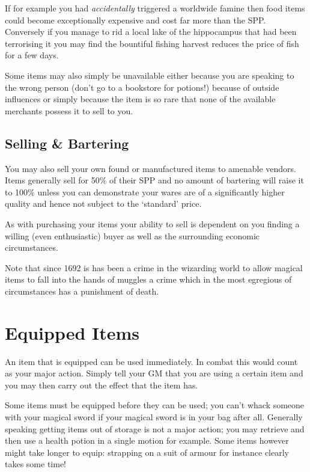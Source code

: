 If\comma{} for example\comma{} you had {\it accidentally} triggered a worldwide famine\comma{} then food items could become exceptionally expensive and cost far more than the SPP. Conversely\comma{} if you manage to rid a local lake of the hippocampus that had been terrorising it\comma{} you may find the bountiful fishing harvest reduces the price of fish for a few days. 

Some items may also simply be unavailable \minus{} either because you are speaking to the wrong person (don't go to a bookstore for potions!)\comma{} because of outside influences\comma{} or simply because the item is so rare that none of the available merchants possess it to sell to you. 

\subsection{Selling \& Bartering}

You may also sell your own found or manufactured items to amenable vendors. Items generally sell for 50\% of their SPP\comma{} and no amount of bartering will raise it to 100\%\comma{} unless you can demonstrate your wares are of a significantly higher quality\comma{} and hence not subject to the `standard' price. 

As with purchasing your items\comma{} your ability to sell is dependent on you finding a willing (even enthusiastic) buyer\comma{} as well as the surrounding economic circumstances. 

Note that since 1692 is has been a crime in the wizarding world to allow magical items to fall into the hands of muggles \minus{} a crime which\comma{} in the most egregious of circumstances\comma{} has a punishment of death. 


\section{Equipped Items}

An item that is equipped can be used immediately. In combat\comma{} this would count as your major action. Simply tell your GM that you are using a certain item\comma{} and you may then carry out the effect that the item has. 

Some items must be equipped before they can be used; you can't whack someone with your magical sword\comma{} if your magical sword is in your bag\comma{} after all. Generally speaking\comma{} getting items out of storage is not a major action; you may retrieve and then use a health potion in a single motion\comma{} for example. Some items\comma{} however\comma{} might take longer to equip: strapping on a suit of armour\comma{} for instance\comma{} clearly takes some time!



